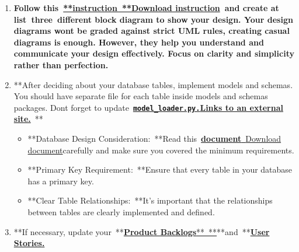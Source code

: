 \documentclass[
]{article}
\providecommand{\tightlist}{%
  \setlength{\itemsep}{0pt}\setlength{\parskip}{0pt}}
\begin{document}
\begin{enumerate}
\def\labelenumi{\arabic{enumi}.}
\item
  \textbf{Follow
  this~\textbf{\href{https://instructure.charlotte.edu/courses/264138/files/33808474?wrap=1}{**instruction~**}\href{https://instructure.charlotte.edu/courses/264138/files/33808474/download?download_frd=1}{\textbf{Download
  instruction}}}~and create at list~three~different block diagram to
  show your design. Your design diagrams won\textquotesingle t be graded
  against strict UML rules, creating casual diagrams is enough. However,
  they help you understand and communicate your design effectively.
  Focus on clarity and simplicity rather than perfection.}
\item
  **After deciding about your database tables, implement models and
  schemas. You should have separate file for each table inside models
  and schemas packages. Don\textquotesingle t forget to
  update~\textbf{\href{https://github.com/samfallahian/ITSC3155-Assignments/blob/main/FinalProject/api/models/model_loader.py}{\textbf{\texttt{model\_loader.py.}}}\href{https://github.com/samfallahian/ITSC3155-Assignments/blob/main/FinalProject/api/models/model_loader.py}{\textbf{Links
  to an external site.}}}~**

  \begin{itemize}
  \tightlist
  \item
    **Database Design Consideration:~**Read
    this~\href{https://instructure.charlotte.edu/courses/264138/files/33808129?wrap=1}{\textbf{document}}\href{https://instructure.charlotte.edu/courses/264138/files/33808129?wrap=1}{~}\href{https://instructure.charlotte.edu/courses/264138/files/33808129/download?download_frd=1}{Download
    document}carefully and make sure you covered the minimum
    requirements.
  \item
    **Primary Key Requirement:~**Ensure that every table in your
    database has a primary key.
  \item
    **Clear Table Relationships:~**It's important that the relationships
    between tables are clearly implemented and defined.
  \end{itemize}
\item
  **If necessary, update
  your~**\href{https://instructure.charlotte.edu/courses/264138/files/33808457?wrap=1}{\textbf{Product
  Backlogs}}\href{https://instructure.charlotte.edu/courses/264138/files/33808457/download}{**~**}**and~**\href{https://instructure.charlotte.edu/courses/264138/files/33808471?wrap=1}{\textbf{User
  Stories.}}
\end{enumerate}
\end{document}
